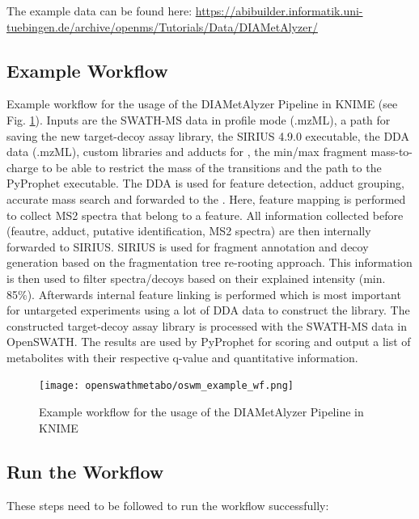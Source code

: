 \noindent The example data can be found here:
\url{https://abibuilder.informatik.uni-tuebingen.de/archive/openms/Tutorials/Data/DIAMetAlyzer/}

\subsection{Example Workflow}
Example workflow for the usage of the DIAMetAlyzer Pipeline in KNIME (see Fig. \ref{fig:oswm_example_wf}). Inputs are the SWATH-MS data in profile mode (.mzML), a path for saving the new target-decoy assay library, the SIRIUS 4.9.0 executable, the DDA data (.mzML), custom libraries and adducts for , the min/max fragment mass-to-charge to be able to restrict the mass of the transitions and the path to the PyProphet executable. The DDA is used for feature detection, adduct grouping, accurate mass search and forwarded to the . Here, feature mapping is performed to collect MS2 spectra that belong to a feature. All information collected before (feautre, adduct, putative identification, MS2 spectra) are then internally forwarded to SIRIUS. SIRIUS is used for fragment annotation and decoy generation based on the fragmentation tree re-rooting approach. This information is then used to filter spectra/decoys based on their explained intensity (min. 85\%). Afterwards internal feature linking is performed which is most important for untargeted experiments using a lot of DDA data to construct the library. The constructed target-decoy assay library is processed with the SWATH-MS data in OpenSWATH. The results are used by PyProphet for scoring and output a list of metabolites with their respective q-value and quantitative information.

\begin{figure}[!h]
  \centering
  \texttt{[image: openswathmetabo/oswm\_example\_wf.png]}
  \caption{Example workflow for the usage of the DIAMetAlyzer Pipeline in KNIME}
  \label{fig:oswm_example_wf}
\end{figure}

\subsection{Run the Workflow}
These steps need to be followed to run the workflow successfully:

